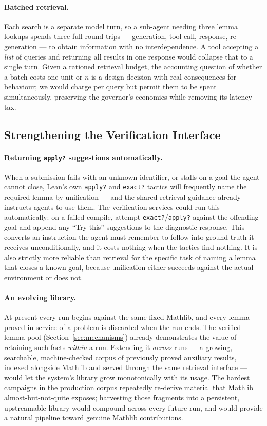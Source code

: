 \documentclass[12pt, a4paper]{article}
\begin{document}
\paragraph{Batched retrieval.} Each search is a separate model turn, so a
sub-agent needing three lemma lookups spends three full round-trips ---
generation, tool call, response, re-generation --- to obtain information with
no interdependence. A tool accepting a \emph{list} of queries and returning
all results in one response would collapse that to a single turn. Given a
rationed retrieval budget, the accounting question of whether a batch costs
one unit or $n$ is a design decision with real consequences for behaviour;
we would charge per query but permit them to be spent simultaneously,
preserving the governor's economics while removing its latency tax.

\subsection{Strengthening the Verification Interface}

\paragraph{Returning \texttt{apply?} suggestions automatically.} When a
submission fails with an unknown identifier, or stalls on a goal the agent
cannot close, Lean's own \texttt{apply?} and \texttt{exact?} tactics will
frequently name the required lemma by unification --- and the shared
retrieval guidance already instructs agents to use them. The verification
services could run this automatically: on a failed compile, attempt
\texttt{exact?}/\texttt{apply?} against the offending goal and append any
``Try this'' suggestions to the diagnostic response. This converts an
instruction the agent must remember to follow into ground truth it receives
unconditionally, and it costs nothing when the tactics find nothing. It is
also strictly more reliable than retrieval for the specific task of naming a
lemma that closes a known goal, because unification either succeeds against
the actual environment or does not.

\paragraph{An evolving library.} At present every run begins against the
same fixed Mathlib, and every lemma proved in service of a problem is
discarded when the run ends. The verified-lemma pool
(Section~\ref{sec:mechanisms}) already demonstrates the value of retaining
such facts \emph{within} a run. Extending it \emph{across} runs --- a growing,
searchable, machine-checked corpus of previously proved auxiliary results,
indexed alongside Mathlib and served through the same retrieval interface ---
would let the system's library grow monotonically with its usage. The
hardest campaigns in the production corpus repeatedly re-derive material
that Mathlib almost-but-not-quite exposes; harvesting those fragments into
a persistent, upstreamable library would compound across every future run,
and would provide a natural pipeline toward genuine Mathlib contributions.
\end{document}
